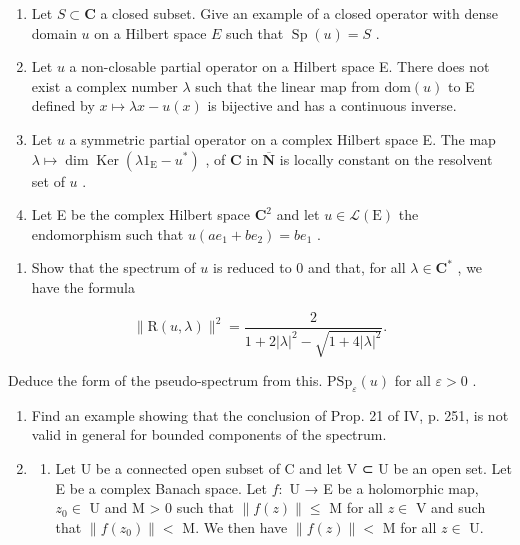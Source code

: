 \begin{enumerate}
\def\labelenumi{\arabic{enumi})}
\setcounter{enumi}{11}
\item
  Let \(S \subset \mathbf{C}\) a closed subset. Give an example of a closed operator with dense domain \(u\) on a Hilbert space \(E\) such that \(\operatorname{Sp}(u) = S\) .
\item
  Let \(u\) a non-closable partial operator on a Hilbert space E. There does not exist a complex number \(\lambda\) such that the linear map from \(\text{dom}(u)\) to E defined by \(x \mapsto \lambda x - u(x)\) is bijective and has a continuous inverse.
\item
  Let \(u\) a symmetric partial operator on a complex Hilbert space E. The map \(\lambda \mapsto \dim \operatorname{Ker}(\lambda 1_{\mathrm{E}} - u^{*})\) , of \(\mathbf{C}\) in \(\overline{\mathbf{N}}\) is locally constant on the resolvent set of \(u\) .
\item
  Let E be the complex Hilbert space \(\mathbf{C}^2\) and let \(u \in \mathcal{L}(\mathrm{E})\) the endomorphism such that \(u(ae_1 + be_2) = be_1\) .
\end{enumerate}

\begin{enumerate}
\def\labelenumi{\alph{enumi})}
\tightlist
\item
  Show that the spectrum of \(u\) is reduced to 0 and that, for all \(\lambda \in \mathbf{C}^*\) , we have the formula
\end{enumerate}

\[
\| \mathrm{R} (u, \lambda) \| ^ {2} = \frac {2}{1 + 2 | \lambda | ^ {2} - \sqrt {1 + 4 | \lambda | ^ {2}}}.
\]

Deduce the form of the pseudo-spectrum from this. \(\mathrm{PSp}_{\varepsilon}(u)\) for all \(\varepsilon > 0\) .

\begin{enumerate}
\def\labelenumi{\arabic{enumi})}
\setcounter{enumi}{15}
\item
  Find an example showing that the conclusion of Prop. 21 of IV, p. 251, is not valid in general for bounded components of the spectrum.
\item
  \begin{enumerate}
  \def\labelenumii{\alph{enumii})}
  \tightlist
  \item
    Let U be a connected open subset of C and let V ⊂ U be an open set. Let E be a complex Banach space. Let \(f\colon\) U → E be a holomorphic map, \(z_0 \in\) U and M \textgreater{} 0 such that \(\|f(z)\| \leqslant\) M for all \(z \in\) V and such that \(\|f(z_0)\| <\) M. We then have \(\|f(z)\| <\) M for all \(z \in\) U.
  \end{enumerate}
\end{enumerate}

